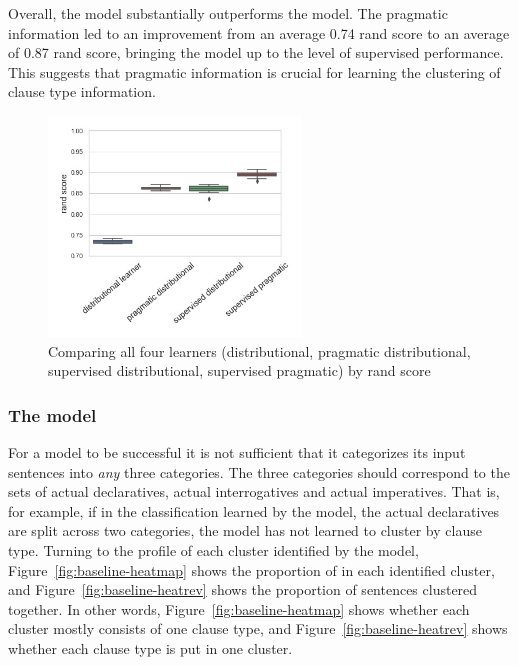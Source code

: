 Overall, the \plearnerabbr{} model substantially outperforms the \dlearnerabbr{} model. The pragmatic information led to an improvement from an average 0.74 rand score to an average of 0.87 rand score, bringing the model up to the level of supervised performance. This suggests that pragmatic information is crucial for learning the clustering of clause type information. 


\begin{figure}[H]
    \centering
    \includegraphics[width=0.6\textwidth]{figures/compare-rand.jpg}
    \caption{Comparing all four learners (distributional, pragmatic distributional, supervised distributional, supervised pragmatic) by rand score }
    \label{fig:compare-rand}
\end{figure}


\subsubsection{The \dlearnerabbr{} model}
\label{sec:engcl:model:results:d}
For a model to be successful it is not sufficient that it categorizes its input sentences into \emph{any} three categories. The three categories should correspond to the sets of actual declaratives, actual interrogatives and actual imperatives. That is, for example, if in the classification learned by the model, the actual declaratives are split across two categories, the model has not learned to cluster by clause type.
Turning to the profile of each cluster identified by the \dlearnerabbr{} model, Figure~\ref{fig:baseline-heatmap} shows the proportion of \diis{} in each identified cluster, and Figure~\ref{fig:baseline-heatrev} shows the proportion of sentences clustered together. In other words, Figure~\ref{fig:baseline-heatmap} shows whether each cluster mostly consists of one clause type, and Figure~\ref{fig:baseline-heatrev} shows whether each clause type is put in one cluster.  



